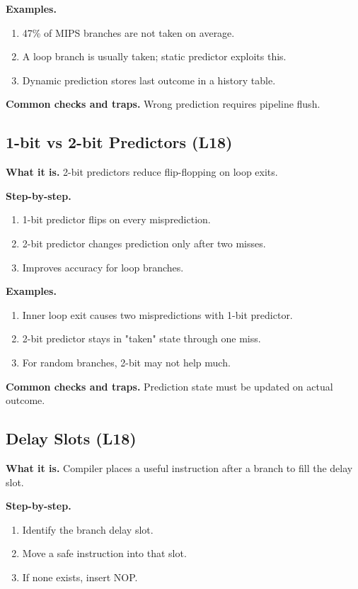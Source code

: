 \documentclass[11pt]{article}
\begin{document}
\textbf{Examples.}
\begin{enumerate}[leftmargin=*]
  \item 47\% of MIPS branches are not taken on average.
  \item A loop branch is usually taken; static predictor exploits this.
  \item Dynamic prediction stores last outcome in a history table.
\end{enumerate}

\textbf{Common checks and traps.} Wrong prediction requires pipeline flush.

\subsection{1-bit vs 2-bit Predictors (L18)}
\textbf{What it is.} 2-bit predictors reduce flip-flopping on loop exits.

\textbf{Step-by-step.}
\begin{enumerate}[leftmargin=*]
  \item 1-bit predictor flips on every misprediction.
  \item 2-bit predictor changes prediction only after two misses.
  \item Improves accuracy for loop branches.
\end{enumerate}

\textbf{Examples.}
\begin{enumerate}[leftmargin=*]
  \item Inner loop exit causes two mispredictions with 1-bit predictor.
  \item 2-bit predictor stays in "taken" state through one miss.
  \item For random branches, 2-bit may not help much.
\end{enumerate}

\textbf{Common checks and traps.} Prediction state must be updated on actual outcome.

\subsection{Delay Slots (L18)}
\textbf{What it is.} Compiler places a useful instruction after a branch to fill the delay slot.

\textbf{Step-by-step.}
\begin{enumerate}[leftmargin=*]
  \item Identify the branch delay slot.
  \item Move a safe instruction into that slot.
  \item If none exists, insert NOP.
\end{enumerate}
\end{document}
